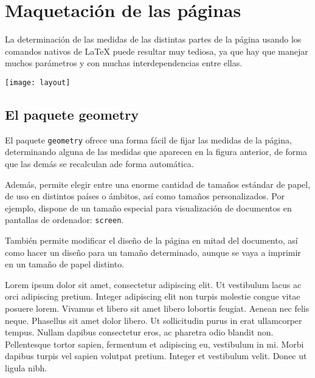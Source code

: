 \documentclass[11pt, a4paper]{report}
\begin{document}
\tableofcontents


\chapter{Maquetación de las páginas}




La determinación de las medidas de las distintas partes de la página usando los comandos nativos de LaTeX puede resultar muy tediosa, ya que hay que manejar muchos parámetros y con muchas interdependencias entre ellas.


\begin{center}
\texttt{[image: layout]}
\end{center}


\section{El paquete geometry}


El paquete \texttt{geometry} ofrece una forma fácil de fijar las medidas de la página, determinando alguna de las medidas que aparecen en la figura anterior, de forma que las demás se recalculan ade forma automática.

Además, permite elegir entre una enorme cantidad de tamaños estándar de papel, de uso en distintos países o ámbitos, así como tamaños personalizados. Por ejemplo, dispone de un tamaño especial para visualización de documentos en pantallas de ordenador: \texttt{screen}.

También permite modificar el diseño de la página en mitad del documento, así como hacer un diseño para un tamaño determinado, aunque se vaya a imprimir en un tamaño de papel distinto.

Lorem ipsum dolor sit amet, consectetur adipiscing elit. Ut vestibulum lacus ac orci adipiscing pretium. Integer adipiscing elit non turpis molestie congue vitae posuere lorem. Vivamus et libero sit amet libero lobortis feugiat. Aenean nec felis neque. Phasellus sit amet dolor libero. Ut sollicitudin purus in erat ullamcorper tempus. Nullam dapibus consectetur eros, ac pharetra odio blandit non. Pellentesque tortor sapien, fermentum et adipiscing eu, vestibulum in mi. Morbi dapibus turpis vel sapien volutpat pretium. Integer et vestibulum velit. Donec ut ligula nibh. 
\end{document}
